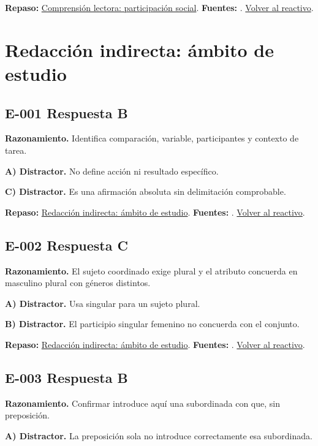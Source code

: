 \textbf{Repaso:} \hyperref[sec:l3]{Comprensión lectora: participación social}. \textbf{Fuentes:} \cite{ceneval,reading}. \hyperref[q:L-030]{Volver al reactivo}.\par\medskip

\section{Redacción indirecta: ámbito de estudio}

\subsection*{E-001 \quad Respuesta B}\label{s:E-001}
\textbf{Razonamiento.} Identifica comparación, variable, participantes y contexto de tarea.

\textbf{A) Distractor. }No define acción ni resultado específico.

\textbf{C) Distractor. }Es una afirmación absoluta sin delimitación comprobable.

\textbf{Repaso:} \hyperref[sec:e1]{Redacción indirecta: ámbito de estudio}. \textbf{Fuentes:} \cite{rae,writing}. \hyperref[q:E-001]{Volver al reactivo}.\par\medskip

\subsection*{E-002 \quad Respuesta C}\label{s:E-002}
\textbf{Razonamiento.} El sujeto coordinado exige plural y el atributo concuerda en masculino plural con géneros distintos.

\textbf{A) Distractor. }Usa singular para un sujeto plural.

\textbf{B) Distractor. }El participio singular femenino no concuerda con el conjunto.

\textbf{Repaso:} \hyperref[sec:e1]{Redacción indirecta: ámbito de estudio}. \textbf{Fuentes:} \cite{rae,writing}. \hyperref[q:E-002]{Volver al reactivo}.\par\medskip

\subsection*{E-003 \quad Respuesta B}\label{s:E-003}
\textbf{Razonamiento.} Confirmar introduce aquí una subordinada con que, sin preposición.

\textbf{A) Distractor. }La preposición sola no introduce correctamente esa subordinada.

